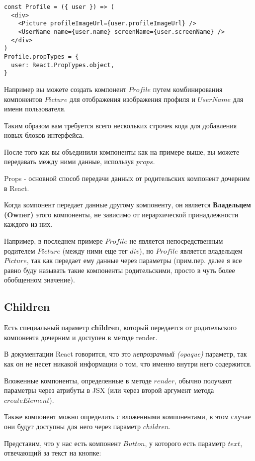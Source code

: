 \begin{lstlisting}
const Profile = ({ user }) => (
  <div>
    <Picture profileImageUrl={user.profileImageUrl} />
    <UserName name={user.name} screenName={user.screenName} />
  </div>
)
Profile.propTypes = {
  user: React.PropTypes.object,
}	
\end{lstlisting}

Например вы можете создать компонент $Profile$ путем комбинирования компонентов $Picture$ для отображения изображения профиля и $UserName$ для имени пользователя.

Таким образом вам требуется всего нескольких строчек кода для добавления новых блоков интерфейса.

После того как вы объединили компоненты как на примере выше, вы можете передавать между ними данные, используя $props$.

Props - основной способ передачи данных от родительских компонент дочерним в React. 

Когда компонент передает данные другому компоненту, он является \textbf{Владельцем (Owner)} этого компоненты, не зависимо от иерархической принадлежности каждого из них.

Например, в последнем примере $Profile$ не является непосредственным родителем $Picture$ (между ними еще тег $div$), но $Profile$ является владельцем $Picture$, так как передает ему данные через параметры (прим.пер. далее я все равно буду называть такие компоненты родительскими, просто в чуть более обобщенном значение).


\subsection*{Children}

Есть специальный параметр \textbf{children}, который передается от родительского компонента дочерним и доступен в методе render.

В документации React говорится, что это \textit{непрозрачный (opaque)} параметр, так как он не несет никакой информации о том, что именно внутри него содержится.

Вложенные компоненты, определенные в методе $render$, обычно получают параметры через атрибуты в JSX (или через второй аргумент метода $createElement$).

Также компонент можно определить с вложенными компонентами, в этом случае они будут доступны для него через параметр $children$.

Представим, что у нас есть компонент $Button$, у которого есть параметр $text$, отвечающий за текст на кнопке:

